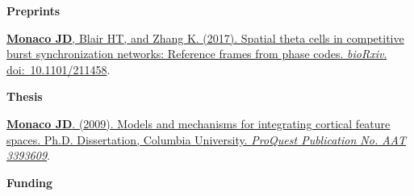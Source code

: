 \documentclass[10pt]{article}
\begin{document}
{\large \textbf{Preprints}}
\begin{description}
\item \href{http://dx.doi.org/10.1101/211458}{\textbf{Monaco JD}, Blair
HT, and Zhang K. (2017). Spatial theta cells in competitive burst
synchronization networks: Reference frames from phase codes. \emph{bioRxiv}.
doi:~10.1101/211458}.
\end{description}

{\large \textbf{Thesis}}

\begin{description}
\item
\href{http://search.proquest.com/docview/304862872/abstract}{\textbf{Monaco JD}.
(2009). Models and mechanisms for integrating cortical feature spaces. Ph.D.
Dissertation, Columbia University. \emph{ProQuest Publication No. AAT 3393609}}.
\end{description}

{\large \textbf{Funding}}
\end{document}
